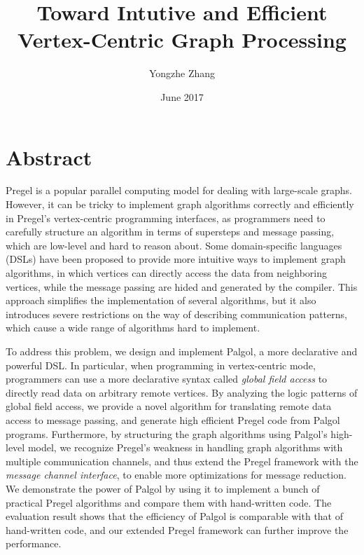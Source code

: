 \documentclass{sokendai_thesis} %
\title{Toward Intutive and Efficient Vertex-Centric Graph Processing}
\author{Yongzhe Zhang}
\date{June 2017}
\begin{document}
\frontmatter
\maketitle

\listoftodos

\chapter*{Abstract}

Pregel is a popular parallel computing model for dealing with large-scale graphs.
However, it can be tricky to implement graph algorithms correctly and efficiently in Pregel's vertex-centric programming interfaces, as programmers need to carefully structure an algorithm in terms of supersteps and message passing, which are low-level and hard to reason about.
Some domain-specific languages (DSLs) have been proposed to provide more intuitive ways to implement graph algorithms, in which vertices can directly access the data from neighboring vertices, while the message passing are hided and generated by the compiler.
This approach simplifies the implementation of several algorithms, but it also introduces severe restrictions on the way of describing communication patterns, which cause a wide range of algorithms hard to implement.

To address this problem, we design and implement Palgol, a more declarative and powerful DSL.
In particular, when programming in vertex-centric mode, programmers can use a more declarative syntax called \emph{global field access} to directly read data on arbitrary remote vertices.
By analyzing the logic patterns of global field access, we provide a novel algorithm for translating remote data access to message passing, and generate high efficient Pregel code from Palgol programs.
Furthermore, by structuring the graph algorithms using Palgol's high-level model, we recognize Pregel's weakness in handling graph algorithms with multiple communication channels, and thus extend the Pregel framework with the \emph{message channel interface}, to enable more optimizations for message reduction.
We demonstrate the power of Palgol by using it to implement a bunch of practical Pregel algorithms and compare them with hand-written code.
The evaluation result shows that the efficiency of Palgol is comparable with that of hand-written code, and our extended Pregel framework can further improve the performance.
\end{document}
